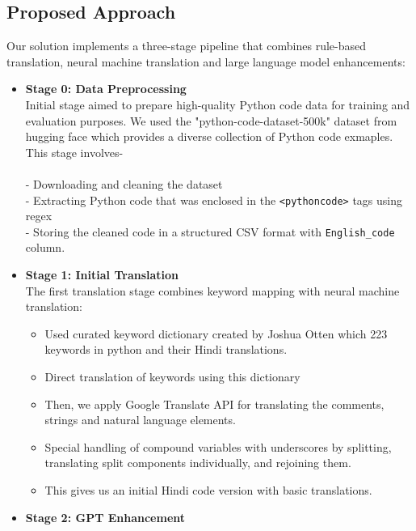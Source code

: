 \documentclass[11pt,a4paper]{article}
\begin{document}
            \subsection{Proposed Approach} 
            Our solution implements a three-stage pipeline that combines rule-based translation, neural machine translation and large language model enhancements:
            \begin{itemize}[itemsep=0pt, topsep=0pt]
                \item \textbf{Stage 0: Data Preprocessing}\\ 
                Initial stage aimed to prepare high-quality Python code data for training and evaluation purposes. We used the "python-code-dataset-500k" dataset from hugging face \cite{jtatman2021python} which provides a diverse collection of Python code exmaples. This stage involves-\\ \\ 
                - Downloading and cleaning the dataset\\ 
                - Extracting Python code that was enclosed in the \texttt{<pythoncode>} tags using regex\\ 
                - Storing the cleaned code in a structured CSV format with \texttt{English\_code} column.
                \item \textbf{Stage 1: Initial Translation}\\
                The first translation stage combines keyword mapping with neural machine translation:
                \begin{itemize}[itemsep=0pt, topsep=0pt]
                    \item Used curated keyword dictionary created by Joshua Otten \cite{otten2021unipy} which 223 keywords in python and their Hindi translations.
                    \item Direct translation of keywords using this dictionary
                    \item Then, we apply Google Translate API for translating the comments, strings and natural language elements.
                    \item Special handling of compound variables with underscores by splitting, translating split components individually, and rejoining them.
                    \item This gives us an initial Hindi code version with basic translations.
                \end{itemize}
                \item \textbf{Stage 2: GPT Enhancement}\\

\end{itemize}
\end{document}
